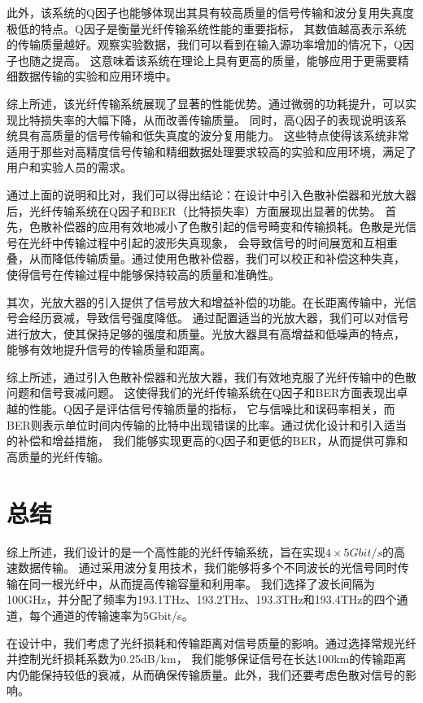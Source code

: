 \documentclass[12pt]{article}
\begin{document}
此外，该系统的Q因子也能够体现出其具有较高质量的信号传输和波分复用失真度极低的特点。Q因子是衡量光纤传输系统性能的重要指标，
其数值越高表示系统的传输质量越好。观察实验数据，我们可以看到在输入源功率增加的情况下，Q因子也随之提高。
这意味着该系统在理论上具有更高的质量，能够应用于更需要精细数据传输的实验和应用环境中。

综上所述，该光纤传输系统展现了显著的性能优势。通过微弱的功耗提升，可以实现比特损失率的大幅下降，从而改善传输质量。
同时，高Q因子的表现说明该系统具有高质量的信号传输和低失真度的波分复用能力。
这些特点使得该系统非常适用于那些对高精度信号传输和精细数据处理要求较高的实验和应用环境，满足了用户和实验人员的需求。

通过上面的说明和比对，我们可以得出结论：在设计中引入色散补偿器和光放大器后，光纤传输系统在Q因子和BER（比特损失率）方面展现出显著的优势。
首先，色散补偿器的应用有效地减小了色散引起的信号畸变和传输损耗。色散是光信号在光纤中传输过程中引起的波形失真现象，
会导致信号的时间展宽和互相重叠，从而降低传输质量。通过使用色散补偿器，我们可以校正和补偿这种失真，
使得信号在传输过程中能够保持较高的质量和准确性。

其次，光放大器的引入提供了信号放大和增益补偿的功能。在长距离传输中，光信号会经历衰减，导致信号强度降低。
通过配置适当的光放大器，我们可以对信号进行放大，使其保持足够的强度和质量。光放大器具有高增益和低噪声的特点，
能够有效地提升信号的传输质量和距离。

综上所述，通过引入色散补偿器和光放大器，我们有效地克服了光纤传输中的色散问题和信号衰减问题。
这使得我们的光纤传输系统在Q因子和BER方面表现出卓越的性能。Q因子是评估信号传输质量的指标，
它与信噪比和误码率相关，而BER则表示单位时间内传输的比特中出现错误的比率。通过优化设计和引入适当的补偿和增益措施，
我们能够实现更高的Q因子和更低的BER，从而提供可靠和高质量的光纤传输。

\clearpage     %
\section{总结}
综上所述，我们设计的是一个高性能的光纤传输系统，旨在实现$4\times 5 Gbit/s$的高速数据传输。
通过采用波分复用技术，我们能够将多个不同波长的光信号同时传输在同一根光纤中，从而提高传输容量和利用率。
我们选择了波长间隔为100GHz，并分配了频率为193.1THz、193.2THz、193.3THz和193.4THz的四个通道，每个通道的传输速率为5Gbit/s。

在设计中，我们考虑了光纤损耗和传输距离对信号质量的影响。通过选择常规光纤并控制光纤损耗系数为0.25dB/km，
我们能够保证信号在长达100km的传输距离内仍能保持较低的衰减，从而确保传输质量。此外，我们还要考虑色散对信号的影响。
\end{document}
